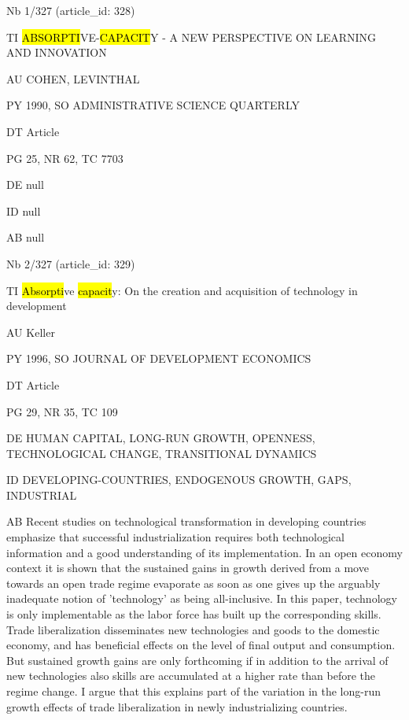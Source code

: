 \documentclass[a4paper]{article}
\begin{document}
\vspace*{-2cm}
Nb \tabto{0cm}1/327 (article\_id: 328)\par
TI \tabto{0cm}\hl{ABSORPTI}VE-\hl{CAPACIT}Y - A NEW PERSPECTIVE ON LEARNING AND INNOVATION\par
AU \tabto{0cm}COHEN, LEVINTHAL\par
PY \tabto{0cm}1990, SO ADMINISTRATIVE SCIENCE QUARTERLY\par
DT \tabto{0cm}Article\par
PG \tabto{0cm}25, NR 62, TC 7703\par
DE \tabto{0cm}null\par
ID \tabto{0cm}null\par
AB \tabto{0cm}null\par
\clearpage

\vspace*{-2cm}
Nb \tabto{0cm}2/327 (article\_id: 329)\par
TI \tabto{0cm}\hl{Absorpti}ve \hl{capacit}y: On the creation and acquisition of technology in development\par
AU \tabto{0cm}Keller\par
PY \tabto{0cm}1996, SO JOURNAL OF DEVELOPMENT ECONOMICS\par
DT \tabto{0cm}Article\par
PG \tabto{0cm}29, NR 35, TC 109\par
DE \tabto{0cm}HUMAN CAPITAL, LONG-RUN GROWTH, OPENNESS, TECHNOLOGICAL CHANGE, TRANSITIONAL DYNAMICS\par
ID \tabto{0cm}DEVELOPING-COUNTRIES, ENDOGENOUS GROWTH, GAPS, INDUSTRIAL\par
AB \tabto{0cm}Recent studies on technological transformation in developing countries emphasize that successful industrialization requires both technological information and a good understanding of its implementation. In an open economy context it is shown that the sustained gains in growth derived from a move towards an open trade regime evaporate as soon as one gives up the arguably inadequate notion of 'technology' as being all-inclusive. In this paper, technology is only implementable as the labor force has built up the corresponding skills. Trade liberalization disseminates new technologies and goods to the domestic economy, and has beneficial effects on the level of final output and consumption. But sustained growth gains are only forthcoming if in addition to the arrival of new technologies also skills are accumulated at a higher rate than before the regime change. I argue that this explains part of the variation in the long-run growth effects of trade liberalization in newly industrializing countries.\par
\clearpage
\end{document}
